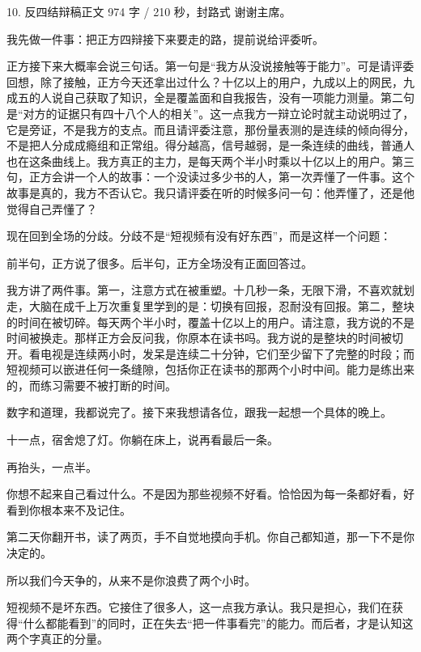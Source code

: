 \documentclass[script,con]{debate}
\begin{document}
\begin{speech}{10. 反四结辩稿}{正文 974 字 / 210 秒，封路式}
谢谢主席。

我先做一件事：把正方四辩接下来要走的路，提前说给评委听。

正方接下来大概率会说三句话。第一句是“我方从没说接触等于能力”。可是请评委回想，除了接触，正方今天还拿出过什么？十亿以上的用户，九成以上的网民，九成五的人说自己获取了知识，全是覆盖面和自我报告，没有一项能力测量。第二句是“对方的证据只有四十八个人的相关”。这一点我方一辩立论时就主动说明过了，它是旁证，不是我方的支点。而且请评委注意，那份量表测的是连续的倾向得分，不是把人分成成瘾组和正常组。得分越高，信号越弱，是一条连续的曲线，普通人也在这条曲线上。我方真正的主力，是每天两个半小时乘以十亿以上的用户。第三句，正方会讲一个人的故事：一个没读过多少书的人，第一次弄懂了一件事。这个故事是真的，我方不否认它。我只请评委在听的时候多问一句：他弄懂了，还是他觉得自己弄懂了？

现在回到全场的分歧。分歧不是“短视频有没有好东西”，而是这样一个问题：

前半句，正方说了很多。后半句，正方全场没有正面回答过。

我方讲了两件事。第一，注意方式在被重塑。十几秒一条，无限下滑，不喜欢就划走，大脑在成千上万次重复里学到的是：切换有回报，忍耐没有回报。第二，整块的时间在被切碎。每天两个半小时，覆盖十亿以上的用户。请注意，我方说的不是时间被换走。那样正方会反问我，你原本在读书吗。我方说的是整块的时间被切开。看电视是连续两小时，发呆是连续二十分钟，它们至少留下了完整的时段；而短视频可以嵌进任何一条缝隙，包括你正在读书的那两个小时中间。能力是练出来的，而练习需要不被打断的时间。

数字和道理，我都说完了。接下来我想请各位，跟我一起想一个具体的晚上。

十一点，宿舍熄了灯。你躺在床上，说再看最后一条。

再抬头，一点半。

你想不起来自己看过什么。不是因为那些视频不好看。恰恰因为每一条都好看，好看到你根本来不及记住。

第二天你翻开书，读了两页，手不自觉地摸向手机。你自己都知道，那一下不是你决定的。

所以我们今天争的，从来不是你浪费了两个小时。

短视频不是坏东西。它接住了很多人，这一点我方承认。我只是担心，我们在获得“什么都能看到”的同时，正在失去“把一件事看完”的能力。而后者，才是认知这两个字真正的分量。


\end{speech}
\end{document}
